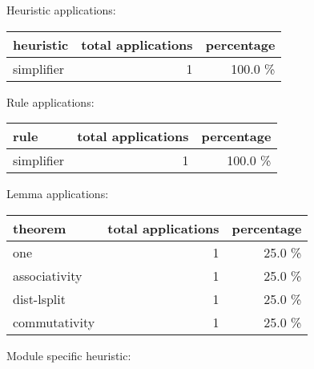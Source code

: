 \documentclass[a4paper]{article}
\begin{document}
\medskip


Heuristic applications:

\begin{supertabular}{l|r|r}
heuristic	& total applications & percentage \\ \hline
simplifier & 1 & 100.0 \% \\

\end{supertabular}

Rule applications:

\begin{supertabular}{l|r|r}
rule	        & total applications & percentage \\ \hline
simplifier & 1 & 100.0 \% \\

\end{supertabular}

Lemma applications:

\begin{supertabular}{l|r|r}
theorem	        & total applications & percentage \\ \hline
one & 1 & 25.0 \% \\
associativity & 1 & 25.0 \% \\
dist-lsplit & 1 & 25.0 \% \\
commutativity & 1 & 25.0 \% \\

\end{supertabular}

Module specific heuristic:
\end{document}

